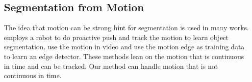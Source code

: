 \subsection{Segmentation from Motion}
The idea that motion can be strong hint for segmentation is used in many works.\cite{Xu:2015:ACS:2816795.2818075} employs a robot to do proactive push and track the motion to learn object segmentation. \cite{unsupervisededge} use the motion in video and use the motion edge as training data to learn an edge detector. These methods lean on the motion that is continuous in time and can be tracked. Our method can handle motion that is not continuous in time.